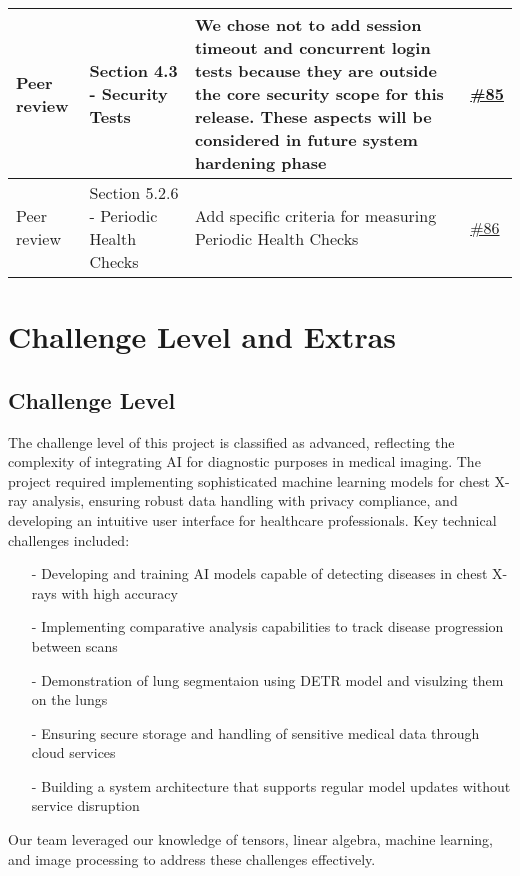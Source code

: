 \documentclass{article}
\begin{document}
\begin{longtable}{| p{} | p{} | p{} | p{} |}
    \hline
    Peer review & Section 4.3 - Security Tests & We chose not to add session timeout and concurrent login tests because they are outside the core security scope for this release. These aspects will be considered in future system hardening phase & \href{https://github.com/RezaJodeiri/CXR-Capstone/issues/85}{\#85} \\
    \hline
    Peer review & Section 5.2.6 - Periodic Health Checks & Add specific criteria for measuring Periodic Health Checks & \href{https://github.com/RezaJodeiri/CXR-Capstone/issues/86}{\#86} \\

\end{longtable}

\section{Challenge Level and Extras}

\subsection{Challenge Level}

The challenge level of this project is classified as advanced, reflecting the complexity of integrating AI for diagnostic purposes in medical imaging. The project required implementing sophisticated machine learning models for chest X-ray analysis, ensuring robust data handling with privacy compliance, and developing an intuitive user interface for healthcare professionals.
\newline
Key technical challenges included:
\begin{itemize}
    \item[-] Developing and training AI models capable of detecting diseases in chest X-rays with high accuracy
    \item[-] Implementing comparative analysis capabilities to track disease progression between scans
    \item[-] Demonstration of lung segmentaion using DETR model and visulzing them on the lungs
    \item[-] Ensuring secure storage and handling of sensitive medical data through cloud services
    \item[-] Building a system architecture that supports regular model updates without service disruption
\end{itemize}

\noindent Our team leveraged our knowledge of tensors, linear algebra, machine learning, and image processing to address these challenges effectively.
\end{document}
